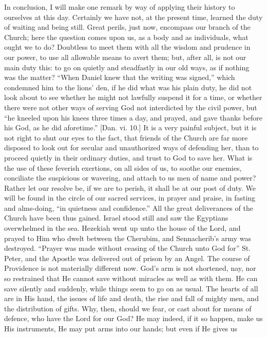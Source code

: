 In conclusion, I will make one remark by way of applying their
history to ourselves at this day. Certainly we have not, at the
present time, learned the duty of waiting and being still. Great
perils, just now, encompass our branch of the Church; here the
question comes upon us, as a body and as individuals, what ought we to
do? Doubtless to meet them with all the wisdom and prudence in our
power, to use all allowable means to avert them; but, after all, is
not our main duty this: to go on quietly and steadfastly in our old
ways, as if nothing was the matter? ``When Daniel knew that the
writing was signed,'' which condemned him to the lions' den, if
he did what was his plain duty, he did not look about to see whether
he might not lawfully suspend it for a time, or whether there were not
other ways of serving God not interdicted by the civil power, but
``he kneeled upon his knees three times a day, and prayed, and
gave thanks before his God, as he did aforetime.'' [Dan. vi. 10.]
It is a very painful subject, but it is not right to shut our eyes to
the fact, that friends of the Church are far more disposed to look out
for secular and unauthorized ways of defending her, than to proceed
quietly in their ordinary duties, and trust to God to save her. What
is the use of these feverish exertions, on all sides of us, to soothe
our enemies, conciliate the suspicious or wavering, and attach to us
men of name and power? Rather let our resolve be, if we are to perish,
it shall be at our post of duty. We will be found in the circle of our
sacred services, in prayer and praise, in fasting and alms-doing,
``in quietness and confidence.'' All the great deliverances of
the Church have been thus gained. Israel stood still and saw the
Egyptians overwhelmed in the sea. Hezekiah went up unto the house of
the Lord, and prayed to Him who dwelt between the Cherubim, and
Sennacherib's army was destroyed. ``Prayer was made without
ceasing of the Church unto God for'' St. Peter, and the Apostle
was delivered out of prison by an Angel. The course of Providence is
not materially different now. God's arm is not shortened, nay, nor
so restrained that He cannot save without miracles as well as with
them. He can save silently and suddenly, while things seem to go on as
usual. The hearts of all are in His hand, the issues of life and
death, the rise and fall of mighty men, and the distribution of gifts.
Why, then, should we fear, or cast about for means of defence, who
have the Lord for our God? He may indeed, if it so happen, make us His
instruments, He may put arms into our hands; but even if He gives us
